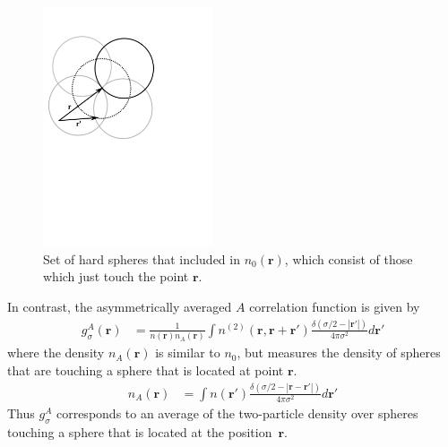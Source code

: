 \documentclass[letterpaper,twocolumn,amsmath,amssymb,jcp,10pt,aip]{revtex4-1}
\newcommand{\rr}{\textbf{r}}
\begin{document}
\begin{figure}
\includegraphics[width=5cm]{figs/n0}
\caption{Set of hard spheres that included in $n_0(\mathbf{r})$, which
  consist of those which just touch the point $\mathbf{r}$.}
\label{fig:n0}
\end{figure}

In contrast, the asymmetrically averaged $A$ correlation function is
given by
\begin{align}
  g^A_\sigma(\rr) &= \frac{1}{n(\rr)n_A(\rr)}
  \int n^{(2)}(\rr, \rr + \rr')
  \frac{\delta(\sigma/2 -|\rr'|)}{4\pi\sigma^2}d\rr' \label{eq:gA}
\end{align}
where the density $n_A(\rr)$ is similar to $n_0$, but measures the
density of spheres that are touching a sphere that is located at
point $\rr$.
\begin{align}
  n_A(\rr) &= \int n(\rr')
  \frac{\delta(\sigma/2 -|\rr-\rr'|)}{4\pi\sigma^2} d\rr' \label{eq:nA}
\end{align}
Thus $g_\sigma^A$ corresponds to an average of the two-particle
density over spheres touching a sphere that is located at the
position~$\rr$.

\end{document}
